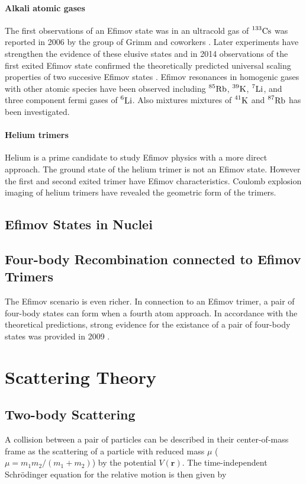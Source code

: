 \documentclass{article}
\numberwithin{equation}{section}
\numberwithin{figure}{section}
\begin{document}
\paragraph{Alkali atomic gases} 
The first observations of an Efimov state was in an ultracold gas of $\prescript{133}{}{\mathrm{Cs}}$ was reported in 2006 by the group of Grimm and coworkers \cite{Grimm:2006}. Later experiments have strengthen the evidence of these elusive states and in 2014 observations of the first exited Efimov state confirmed the theoretically predicted universal scaling properties of two succesive Efimov states \cite{Huang2014}. Efimov resonances in homogenic gases with other atomic species have been observed including $\prescript{85}{}{\mathrm{Rb}}$, $\prescript{39}{}{\mathrm{K}}$, $\prescript{7}{}{\mathrm{Li}}$, and three component fermi gases of $\prescript{6}{}{\mathrm{Li}}$. Also mixtures mixtures of $\prescript{41}{}{\mathrm{K}}$ and $\prescript{87}{}{\mathrm{Rb}}$ has been investigated.

\paragraph{Helium trimers}
Helium is a prime candidate to study Efimov physics with a more direct approach. The ground state of the helium trimer is not an Efimov state. However the first and second exited trimer have Efimov characteristics. Coulomb explosion imaging of helium trimers have revealed the geometric form of the trimers. \cite{Kunitski:2015qth}

\subsection{Efimov States in Nuclei }

\subsection{Four-body Recombination connected to Efimov Trimers} 
The Efimov scenario is even richer. In connection to an Efimov trimer, a pair of four-body states can form when a fourth atom approach. In accordance with the theoretical predictions, strong evidence for the existance of a pair of four-body states was provided in 2009 \cite{Grimm:2009}.

\section{Scattering Theory}
\subsection{Two-body Scattering} \label{Two-body scattering}
A collision between a pair of particles can be described in their center-of-mass frame as the scattering of a particle with reduced mass $\mu$ ($\mu = m_1m_2/(m_1 + m_2)$) by the potential $V(\mathbf{r})$. The time-independent  Schr{\"o}dinger equation for the relative motion is then given by 
\end{document}
